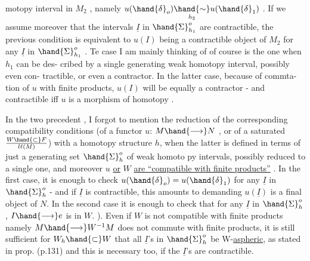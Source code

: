 motopy interval in $M_2$ , namely $u(\hand{\delta}_o) \underset{h_2}{\hand{\sim}} u(\hand{\delta}_1)$ . If we assume moreover
that the intervals $\underline{I}$ in $\hand{\Sigma}^o_{h_1}$ are contractible, the previous condition is
equivalent to $u(I)$ being a contractible object of $M_2$ for any $\underline{I}$ in $\hand{\Sigma}^o_{h_1}$ .
Te case I am mainly thinking of of course is the one when $h_1$ can be des-%
cribed by a single generating weak homotopy interval, possibly even con-%
tractible, or even  a  contractor. In the latter case, because of commta-%
tion of $u$ with finite products, $u(I)$ will be equally a contractor - and
contractible  iff $u$ is a morphism of homotopy .

In the two precedent  , I forgot to mention the 
reduction of the corresponding compatibility conditions (of a functor $u$:
$M \hand{\longrightarrow} N$ , or of a saturated $W \hand{\subset} F\over{l}{\ell}(M)$) with a homotopy structure $h$, when
the latter is defined in terms of just a generating set $\hand{\Sigma}^o_h$ of weak homoto%
py intervals, possibly reduced to a single one, and moreover $u$ \uline{or} $W$
\margin{$\times$} \uline{are ``compatible with finite products''} . In the first case, it is enough
to check $u(\hand{\delta}_o)=u(\hand{\delta}_1)$ for any $\underline{I}$ in $\hand{\Sigma}^o_h$  - and if $\underline{I}$ is contractible,
this amounts to demanding $u(\underline{I})$ is a final object of $N$. In the second case
it is enough  to check that  for any $\underline{I}$ in $\hand{\Sigma}^o_h$ , $I \hand{\longrightarrow} e$ is in $W$. \unsure{(} 
). Even if
$W$ is not  compatible with finite products namely $M \hand{\longrightarrow} W^{-1}M$ does not commute
with finite products, it is still sufficient 
 for $W_h \hand{\subset} W$ that all $\underline{I}$'s in $\hand{\Sigma}^o_h$ be W-\uline{aspheric},
\hand{(}as stated in prop. (p.131)\hand{)}\hand{,} and this is necessary too, if the $\underline{I}$'s are
contractible.


